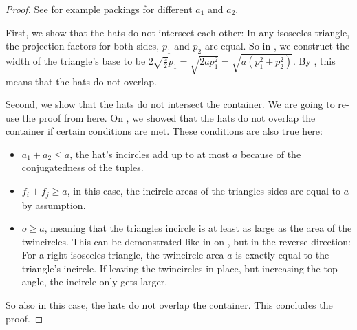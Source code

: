 \documentclass[a4paper,style=print,bibliography=totoc,nexus,lnum,extramargin]{tubsbook}
\begin{document}
\begin{proof}
    See  for example packings for different $a_1$ and $a_2$.

    First, we show that the hats do not intersect each other: In any isosceles triangle, the projection factors for both sides, $p_1$ and $p_2$ are equal. So in , we construct the width of the triangle's base to be $2\sqrt{\frac{a}{2}}p_1 = \sqrt{2ap_1^2} = \sqrt{a(p_1^2+p_2^2)}$. By , this means that the hats do not overlap.


    Second, we show that the hats do not intersect the container. We are going to re-use the proof from  here. On , we showed that the hats do not overlap the container if certain conditions are met. These conditions are also true here:

    \begin{itemize}
        \item $a_1 + a_2 \le a$, the hat's incircles add up to at most $a$ because of the conjugatedness of the tuples.
        \item $f_i + f_j \ge a$, in this case, the incircle-areas of the triangles sides are equal to $a$ by assumption.
        \item $o \ge a$, meaning that the triangles incircle is at least as large as the area of the twincircles. This can be demonstrated like in  on , but in the reverse direction: For a right isosceles triangle, the twincircle area $a$ is exactly equal to the triangle's incircle. If leaving the twincircles in place, but increasing the top angle, the incircle only gets larger.
    \end{itemize}

    So also in this case, the hats do not overlap the container. This concludes the proof.
\end{proof}
\end{document}
